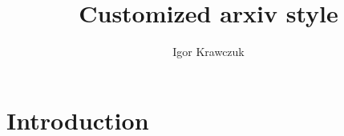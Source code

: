 \documentclass{article}
\title{Customized arxiv style}
\author{
    Igor Krawczuk
}
\begin{document}
\maketitle

\begin{abstract}
\lipsum[1]
\end{abstract}




\section{Introduction}
\cite{hadash2018estimate}

\printbibliography
\printglossaries
\end{document}

